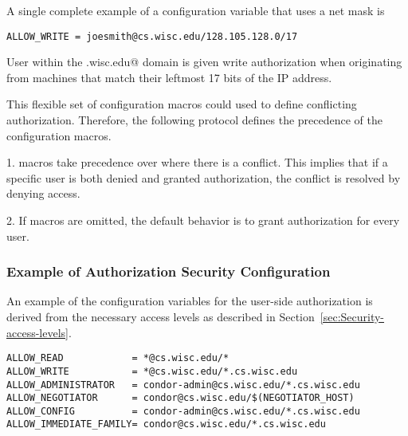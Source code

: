 A single complete example of a configuration variable that uses
a net mask is
\begin{verbatim}
ALLOW_WRITE = joesmith@cs.wisc.edu/128.105.128.0/17
\end{verbatim}
User \verb@joesmith@ within the
\verb@cs.wisc.edu@ domain is given write authorization
when originating from machines that match their leftmost
17 bits of the IP address.

This flexible set of configuration macros could used to define
conflicting authorization.
Therefore, the following protocol defines the precedence of the
configuration macros.
\begin{description}
\item{1. } macros take precedence over 
where there is a conflict.
This implies that if a specific user is both denied and granted authorization,
the conflict is resolved by denying access.
\item{2. }If macros are omitted, the default behavior is to grant
authorization for every user.
\end{description}
\subsubsection{\label{sec:Security-sample2} Example of Authorization Security Configuration}

An example of the configuration variables for the user-side
authorization is derived from the necessary access levels
as described in
Section~\ref{sec:Security-access-levels}.

\begin{verbatim}
ALLOW_READ            = *@cs.wisc.edu/*
ALLOW_WRITE           = *@cs.wisc.edu/*.cs.wisc.edu
ALLOW_ADMINISTRATOR   = condor-admin@cs.wisc.edu/*.cs.wisc.edu
ALLOW_NEGOTIATOR      = condor@cs.wisc.edu/$(NEGOTIATOR_HOST)
ALLOW_CONFIG          = condor-admin@cs.wisc.edu/*.cs.wisc.edu
ALLOW_IMMEDIATE_FAMILY= condor@cs.wisc.edu/*.cs.wisc.edu
\end{verbatim}

